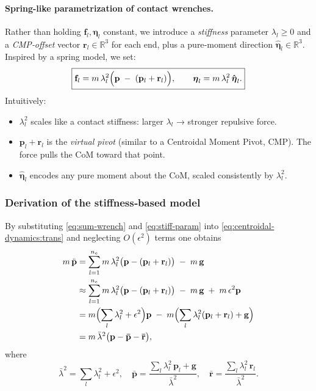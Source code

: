 \documentclass[main.tex]{subfiles}
\begin{document}
\medskip
\paragraph{Spring-like parametrization of contact wrenches.}
Rather than holding $\mathbf{f}_l,\boldsymbol{\eta}_l$ constant, we introduce a \emph{stiffness} parameter $\lambda_l\ge0$ and a \emph{CMP‐offset} vector $\mathbf{r}_l\in\mathbb{R}^3$ for each end, plus a pure‐moment direction $\mathbf{\hat{\boldsymbol{\eta}}}_l\in\mathbb{R}^3$.  Inspired by a spring model, we set:
\begin{equation}\label{eq:stiff‐param}
\boxed{
\displaystyle
\mathbf{f}_l = m\,\lambda_l^2\Bigl(\mathbf{p} \;-\;(\mathbf{p}_l + \mathbf{r}_l)\Bigr),
\qquad
\boldsymbol{\eta}_l = m\,\lambda_l^2\,\mathbf{\hat{\boldsymbol{\eta}}}_l.
}
\end{equation}
Intuitively:
\begin{itemize}
  \item $\lambda_l^2$ scales like a contact stiffness: larger $\lambda_l$ → stronger repulsive force.
  \item $\mathbf{p}_l + \mathbf{r}_l$ is the \emph{virtual pivot} (similar to a Centroidal Moment Pivot, CMP).  The force pulls the CoM toward that point.
  \item $\mathbf{\hat{\boldsymbol{\eta}}}_l$ encodes any pure moment about the CoM, scaled consistently by $\lambda_l^2$.
\end{itemize}

\subsubsection*{Derivation of the stiffness‐based model}
By substituting \eqref{eq:sum‐wrench} and \eqref{eq:stiff‐param} into \eqref{eq:centroidal‐dynamics:trans} and neglecting $O(\epsilon^2)$ terms one obtains
\begin{align}
m\,\ddot{\mathbf{p}}
&= \sum_{l=1}^{n_e} m\,\lambda_l^2\bigl(\mathbf{p} - (\mathbf{p}_l + \mathbf{r}_l)\bigr) \;-\; m\,\mathbf{g}
\notag\\
&\approx \sum_{l=1}^{n_e} m\,\lambda_l^2\bigl(\mathbf{p} - (\mathbf{p}_l + \mathbf{r}_l)\bigr) \;-\; m\,\mathbf{g} \;+\; m\,\epsilon^2 \mathbf{p}
\notag\\
&= m\Bigl(\sum_{l}\lambda_l^2 + \epsilon^2\Bigr)\mathbf{p} \;-\; m\Bigl(\sum_{l}\lambda_l^2(\mathbf{p}_l + \mathbf{r}_l) + \mathbf{g}\Bigr)
\notag\\
&= m\,\bar\lambda^2\bigl(\mathbf{p} - \mathbf{\bar{p}} - \mathbf{\bar{r}}\bigr),
\label{eq:deriv‐trans}
\end{align}
where
\[
\bar\lambda^2 = \sum_{l}\lambda_l^2 + \epsilon^2,
\quad
\mathbf{\bar{p}} = \frac{\sum_{l}\lambda_l^2\,\mathbf{p}_l + \mathbf{g}}{\bar\lambda^2},
\quad
\mathbf{\bar{r}} = \frac{\sum_{l}\lambda_l^2\,\mathbf{r}_l}{\bar\lambda^2}.
\]
\end{document}
